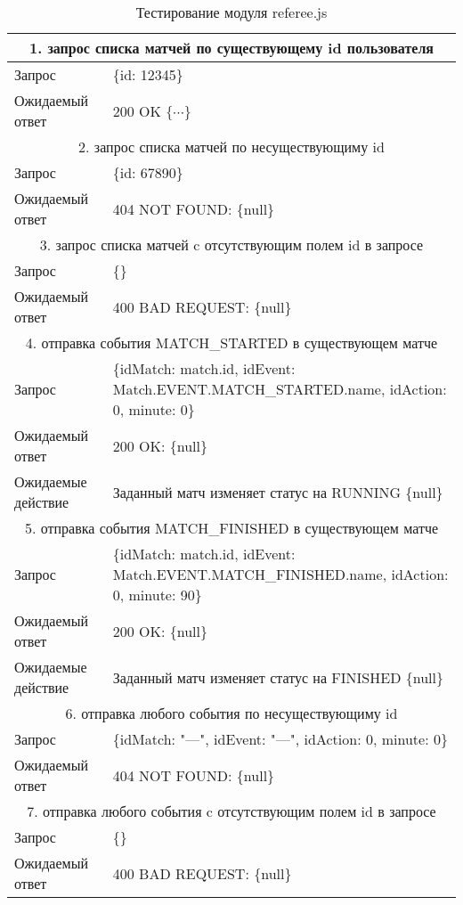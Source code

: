 \begin{table}
\caption{\label{tab:refereejs}Тестирование модуля referee.js}
\begin{center}
\begin{tabular}{|l|p{10cm}|}

\hline
\multicolumn{2}{|c|}{1. запрос списка матчей по существующему id пользователя} \\
\hline
Запрос & \{id: 12345\} \\
Ожидаемый ответ & 200 OK $\{\cdots\}$ \\
\hline

\multicolumn{2}{|c|}{2. запрос списка матчей по несуществующиму id} \\
\hline
Запрос & \{id: 67890\} \\
Ожидаемый ответ & 404 NOT FOUND: \{null\} \\
\hline

\multicolumn{2}{|c|}{3. запрос списка матчей c отсутствующим полем id в запросе} \\
\hline
Запрос & \{\} \\
Ожидаемый ответ & 400 BAD REQUEST: \{null\} \\
\hline

\multicolumn{2}{|c|}{4. отправка события MATCH\_STARTED в существующем матче} \\
\hline
Запрос & \{idMatch: match.id,
                idEvent: Match.EVENT.MATCH\_STARTED.name,
                idAction: 0,
                minute: 0\} \\
Ожидаемый ответ & 200 OK: \{null\} \\
Ожидаемые действие & Заданный матч изменяет статус на RUNNING \{null\} \\
\hline

\multicolumn{2}{|c|}{5. отправка события MATCH\_FINISHED в существующем матче} \\
\hline
Запрос & \{idMatch: match.id,
                idEvent: Match.EVENT.MATCH\_FINISHED.name,
                idAction: 0,
                minute: 90\} \\
Ожидаемый ответ & 200 OK: \{null\} \\
Ожидаемые действие & Заданный матч изменяет статус на FINISHED \{null\} \\
\hline


\multicolumn{2}{|c|}{6. отправка любого события по несуществующиму id} \\
\hline
Запрос & \{idMatch: "---",
                idEvent: "---",
                idAction: 0,
                minute: 0\} \\
Ожидаемый ответ & 404 NOT FOUND: \{null\} \\
\hline

\multicolumn{2}{|c|}{7. отправка любого события c отсутствующим полем id в запросе} \\
\hline
Запрос & \{\} \\
Ожидаемый ответ & 400 BAD REQUEST: \{null\} \\
\hline

\end{tabular}
\end{center}
\end{table} 